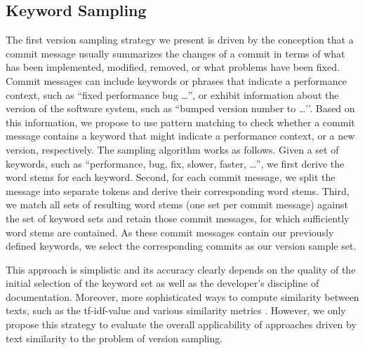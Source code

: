 \subsection{Keyword Sampling}
The first version sampling strategy we present is driven by the conception that
a commit message usually summarizes the changes of a commit in terms of what
has been implemented, modified, removed, or what problems have been fixed.
Commit messages can include keywords or phrases that indicate a performance
context, such as ``\textsf{fixed performance bug \ldots}'', or exhibit
information about the version of the software system, such as ``\textsf{bumped
version number to \ldots'}'.
Based on this information, we propose to use pattern matching to check whether a commit
message contains a keyword that might indicate a performance context, or a new
version, respectively. The sampling algorithm works as follows. Given a set of
keywords, such as ``\textsf{performance, bug, fix, slower, faster, \ldots}'', we
first derive the word stems for each keyword. Second, for each commit message, we split the
message into separate tokens and derive their corresponding word stems. Third,
we match all sets of resulting word stems (one set per commit message) against
the set of keyword sets and retain those commit messages, for which
sufficiently word stems are contained. As these commit messages contain our
previously defined keywords, we select the corresponding commits as our version
sample set.

This approach is simplistic and its accuracy clearly
depends on the quality of the initial selection of the keyword set as well as
the developer's discipline of documentation. Moreover, more sophisticated ways
to compute similarity between texts, such as the tf-idf-value and various
similarity metrics \citep{huang_similarity_2008}. However, we only propose this strategy to evaluate the overall applicability of approaches driven by text
similarity to the problem of version sampling.

